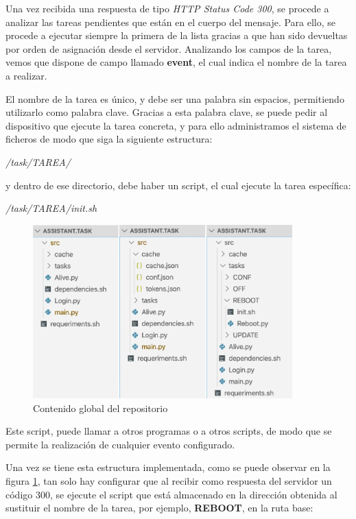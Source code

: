 Una vez recibida una respuesta de tipo \textit{HTTP Status Code 300}, se procede a analizar las tareas pendientes que están en el cuerpo del mensaje. Para ello, se procede a ejecutar siempre la primera de la lista gracias a que han sido devueltas por orden de asignación desde el servidor.
Analizando los campos de la tarea, vemos que dispone de campo llamado \textbf{event}, el cual indica el nombre de la tarea a realizar.

El nombre de la tarea es único, y debe ser una palabra sin espacios, permitiendo utilizarlo como palabra clave.
Gracias a esta palabra clave, se puede pedir al dispositivo que ejecute la tarea concreta, y para ello administramos el sistema de ficheros de modo que siga la siguiente estructura:

\begin{center}
    \textit{/task/TAREA/}
\end{center}
y dentro de ese directorio, debe haber un script, el cual ejecute la tarea específica:

\begin{center}
    \textit{/task/TAREA/init.sh}
\end{center}

\begin{figure}[h!]
    \centering
    \includegraphics[width=10cm]{./img/arch/device/src.task.png}
    \caption{Contenido global del repositorio}
    \label{fig:src.task}
\end{figure}

Este script, puede llamar a otros programas o a otros scripts, de modo que se permite la realización de cualquier evento configurado.

Una vez se tiene esta estructura implementada, como se puede observar en la figura \ref{fig:src.task}, tan solo hay configurar que al recibir como respuesta del servidor un código 300, se ejecute el script que está almacenado en la dirección obtenida al sustituir el nombre de la tarea, por ejemplo, \textbf{REBOOT}, en la ruta base:

